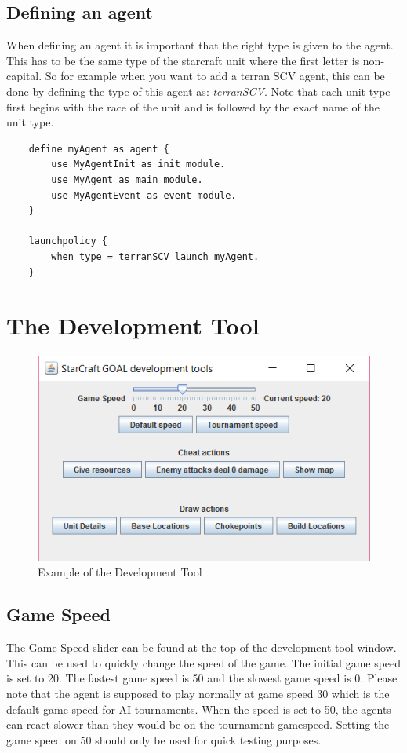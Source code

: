 \subsection{Defining an agent}
When defining an agent it is important that the right type is given to the agent. This has to be the same type of the starcraft unit where the first letter is non-capital. So for example when you want to add a terran SCV agent, this can be done by defining the type of this agent as: \textit{terranSCV}. Note that each unit type first begins with the race of the unit and is followed by the exact name of the unit type.

\begin{verbatim}
    define myAgent as agent {  
        use MyAgentInit as init module.
        use MyAgent as main module.
        use MyAgentEvent as event module.
    }
    
    launchpolicy {
        when type = terranSCV launch myAgent.
    }
\end{verbatim}


\newpage
\section{The Development Tool}
\label{development tool}

\begin{figure}[h]
\includegraphics[width=1.0\textwidth]{images/developmentTool}
\caption{Example of the Development Tool}
\label{fig:starcraft_picture}
\end{figure}

\subsection{Game Speed}
The Game Speed slider can be found at the top of the development tool window. This can be used to quickly change the speed of the game. The initial game speed is set to 20. The fastest game speed is 50 and the slowest game speed is 0. Please note that the agent is supposed to play normally at game speed 30 which is the default game speed for AI tournaments. When the speed is set to 50, the agents can react slower than they would be on the tournament gamespeed. Setting the game speed on 50 should only be used for quick testing purposes.

